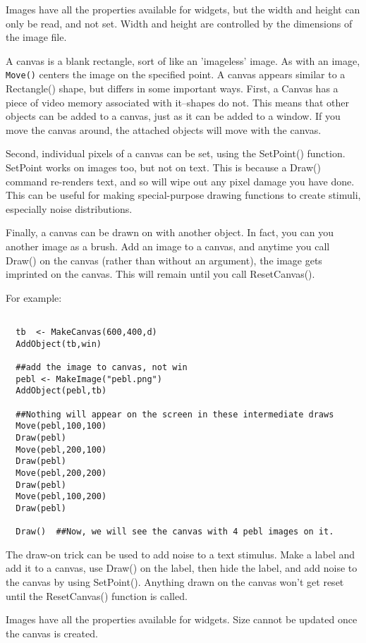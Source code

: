 Images have all the properties available for widgets, but the width
and height can only be read, and not set.  Width and height are
controlled by the dimensions of the image file.


A canvas is a blank rectangle, sort of like an 'imageless' image. As
with an image, \texttt{Move()} centers the image on the specified
point. A canvas appears similar to a Rectangle() shape, but differs in
some important ways.  First, a Canvas has a piece of video memory
associated with it--shapes do not.  This means that other objects can
be added to a canvas, just as it can be added to a window.  If you
move the canvas around, the attached objects will move with the
canvas.  

Second, individual pixels of a canvas can be set, using the SetPoint()
function. SetPoint works on images too, but not on text.  This is
because a Draw() command re-renders text, and so will wipe out any
pixel damage you have done.  This can be useful for making
special-purpose drawing functions to create stimuli, especially noise
distributions.

Finally, a canvas can be drawn on with another object.  In fact, you can you
another image as a brush.  Add an image to a canvas, and anytime you
call Draw() on the canvas (rather than without an argument), the image
gets imprinted on the canvas.  This will remain until you call
ResetCanvas().

For example:
\begin{verbatim}

  tb  <- MakeCanvas(600,400,d)
  AddObject(tb,win)

  ##add the image to canvas, not win
  pebl <- MakeImage("pebl.png")
  AddObject(pebl,tb)

  ##Nothing will appear on the screen in these intermediate draws
  Move(pebl,100,100)
  Draw(pebl)
  Move(pebl,200,100)
  Draw(pebl)
  Move(pebl,200,200)
  Draw(pebl)
  Move(pebl,100,200)
  Draw(pebl)

  Draw()  ##Now, we will see the canvas with 4 pebl images on it.
\end{verbatim}


The draw-on trick can be used to add noise to a text stimulus.  Make
a label and add it to a canvas, use Draw() on the label, then hide the
label, and add noise to the canvas by using SetPoint().
Anything drawn on the canvas won't get reset until the ResetCanvas()
function is called.

Images have all the properties available for widgets.  Size cannot be
updated once the canvas is created.

